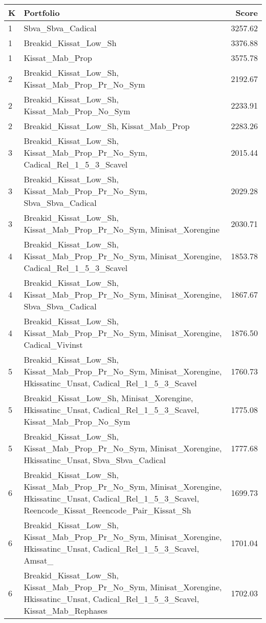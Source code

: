 \begin{tabular}{l|p{.9\linewidth}r}
\toprule
K & Portfolio & Score \\
\midrule
1 & Sbva\_Sbva\_Cadical & 3257.62 \\
1 & Breakid\_Kissat\_Low\_Sh & 3376.88 \\
1 & Kissat\_Mab\_Prop & 3575.78 \\
2 & Breakid\_Kissat\_Low\_Sh, Kissat\_Mab\_Prop\_Pr\_No\_Sym & 2192.67 \\
2 & Breakid\_Kissat\_Low\_Sh, Kissat\_Mab\_Prop\_No\_Sym & 2233.91 \\
2 & Breakid\_Kissat\_Low\_Sh, Kissat\_Mab\_Prop & 2283.26 \\
3 & Breakid\_Kissat\_Low\_Sh, Kissat\_Mab\_Prop\_Pr\_No\_Sym, Cadical\_Rel\_1\_5\_3\_Scavel & 2015.44 \\
3 & Breakid\_Kissat\_Low\_Sh, Kissat\_Mab\_Prop\_Pr\_No\_Sym, Sbva\_Sbva\_Cadical & 2029.28 \\
3 & Breakid\_Kissat\_Low\_Sh, Kissat\_Mab\_Prop\_Pr\_No\_Sym, Minisat\_Xorengine & 2030.71 \\
4 & Breakid\_Kissat\_Low\_Sh, Kissat\_Mab\_Prop\_Pr\_No\_Sym, Minisat\_Xorengine, Cadical\_Rel\_1\_5\_3\_Scavel & 1853.78 \\
4 & Breakid\_Kissat\_Low\_Sh, Kissat\_Mab\_Prop\_Pr\_No\_Sym, Minisat\_Xorengine, Sbva\_Sbva\_Cadical & 1867.67 \\
4 & Breakid\_Kissat\_Low\_Sh, Kissat\_Mab\_Prop\_Pr\_No\_Sym, Minisat\_Xorengine, Cadical\_Vivinst & 1876.50 \\
5 & Breakid\_Kissat\_Low\_Sh, Kissat\_Mab\_Prop\_Pr\_No\_Sym, Minisat\_Xorengine, Hkissatinc\_Unsat, Cadical\_Rel\_1\_5\_3\_Scavel & 1760.73 \\
5 & Breakid\_Kissat\_Low\_Sh, Minisat\_Xorengine, Hkissatinc\_Unsat, Cadical\_Rel\_1\_5\_3\_Scavel, Kissat\_Mab\_Prop\_No\_Sym & 1775.08 \\
5 & Breakid\_Kissat\_Low\_Sh, Kissat\_Mab\_Prop\_Pr\_No\_Sym, Minisat\_Xorengine, Hkissatinc\_Unsat, Sbva\_Sbva\_Cadical & 1777.68 \\
6 & Breakid\_Kissat\_Low\_Sh, Kissat\_Mab\_Prop\_Pr\_No\_Sym, Minisat\_Xorengine, Hkissatinc\_Unsat, Cadical\_Rel\_1\_5\_3\_Scavel, Reencode\_Kissat\_Reencode\_Pair\_Kissat\_Sh & 1699.73 \\
6 & Breakid\_Kissat\_Low\_Sh, Kissat\_Mab\_Prop\_Pr\_No\_Sym, Minisat\_Xorengine, Hkissatinc\_Unsat, Cadical\_Rel\_1\_5\_3\_Scavel, Amsat\_ & 1701.04 \\
6 & Breakid\_Kissat\_Low\_Sh, Kissat\_Mab\_Prop\_Pr\_No\_Sym, Minisat\_Xorengine, Hkissatinc\_Unsat, Cadical\_Rel\_1\_5\_3\_Scavel, Kissat\_Mab\_Rephases & 1702.03 \\

\end{tabular}
